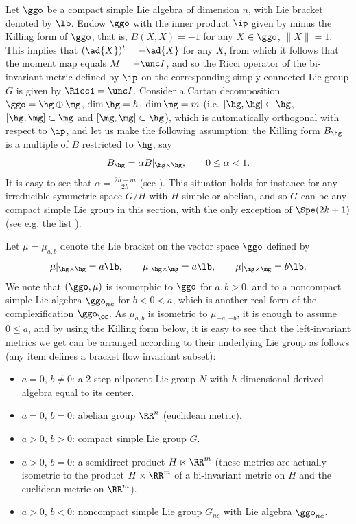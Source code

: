 \documentclass[11pt]{amsart}
\theoremstyle{plain}
\theoremstyle{definition}
\theoremstyle{remark}
\begin{document}
Let $\ggo$ be a compact simple Lie algebra of dimension $n$, with Lie bracket denoted by $\lb$.  Endow $\ggo$ with the inner product $\ip$ given by minus the Killing form of $\ggo$, that is, $B(X,X)=-1$ for any $X\in\ggo$, $\| X\|=1$.  This implies that $(\ad{X})^t=-\ad{X}$ for any $X$, from which it follows that the moment map equals $M=-\unc I$, and so the Ricci operator of the bi-invariant metric defined by $\ip$ on the corresponding simply connected Lie group $G$ is given by $\Ricci=\unc I$.  Consider a Cartan decomposition
$\ggo=\hg\oplus\mg$, $\dim{\hg}=h$, $\dim{\mg}=m$ (i.e. $[\hg,\hg]\subset\hg$, $[\hg,\mg]\subset\mg$ and $[\mg,\mg]\subset\hg$), which is automatically orthogonal with respect to $\ip$, and let us make the following assumption: the Killing form $B_{\hg}$ is a multiple of $B$ restricted to $\hg$, say
\begin{equation}\label{killh}
B_{\hg}=\alpha B|_{\hg\times\hg}, \qquad 0\leq\alpha<1.
\end{equation}
It is easy to see that $\alpha=\frac{2h-m}{2h}$ (see \cite[Theorem 11,(i)]{DtrZll}).  This situation holds for instance for any irreducible symmetric space $G/H$ with $H$ simple or abelian, and so $G$ can be any compact simple Lie group in this section, with the only exception of $\Spe(2k+1)$ (see e.g. the list \cite[Table 7.102]{Bss}).

Let $\mu=\mu_{a,b}$ denote the Lie bracket on the vector space $\ggo$ defined by
$$
\mu|_{\hg\times\hg}=a\lb, \qquad \mu|_{\hg\times\mg}=a\lb, \qquad \mu|_{\mg\times\mg}=b\lb.
$$
We note that $(\ggo,\mu)$ is isomorphic to $\ggo$ for $a,b>0$, and to a noncompact simple Lie algebra $\ggo_{nc}$ for $b<0<a$, which is another real form of the complexification $\ggo_{\CC}$.  As $\mu_{a,b}$ is isometric to $\mu_{-a,-b}$, it is enough to assume $0\leq a$, and by using the Killing form below, it is easy to see that the left-invariant metrics we get can be arranged according to their underlying Lie group as follows (any item defines a bracket flow invariant subset):

\begin{itemize}
\item[(i)] $a=0$, $b\ne 0$: a $2$-step nilpotent Lie group $N$ with $h$-dimensional derived algebra equal to its center.

\item[(ii)] $a=0$, $b=0$: abelian group $\RR^n$ (euclidean metric).

\item[(iii)] $a>0$, $b>0$: compact simple Lie group $G$.

\item[(iv)] $a>0$, $b=0$: a semidirect product $H\ltimes\RR^m$ (these metrics are actually isometric to the product $H\times\RR^m$ of a bi-invariant metric on $H$ and the euclidean metric on $\RR^m$).

\item [(v)] $a>0$, $b<0$: noncompact simple Lie group $G_{nc}$ with Lie algebra $\ggo_{nc}$.
\end{itemize}
\end{document}
